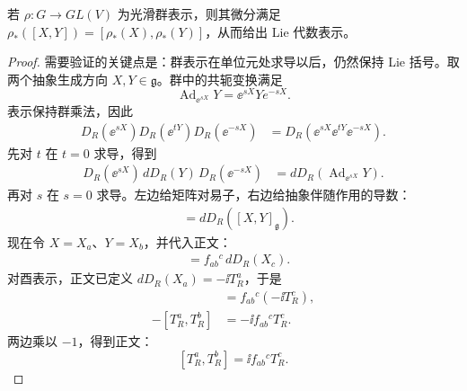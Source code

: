 \begin{proposition}[表示的微分保持括号]
若 $\rho:G\to GL(V)$ 为光滑群表示，则其微分满足 $\rho_*([X,Y])=[\rho_*(X),\rho_*(Y)]$，从而给出 Lie 代数表示。
\end{proposition}
\begin{proof}
需要验证的关键点是：群表示在单位元处求导以后，仍然保持 Lie 括号。取两个抽象生成方向 $X,Y\in\mathfrak g$。群中的共轭变换满足
\[
\operatorname{Ad}_{\ee^{sX}}Y=\ee^{sX}Ye^{-sX}.
\]
表示保持群乘法，因此
\begin{align*}
D_R(\ee^{sX})D_R(\ee^{tY})D_R(\ee^{-sX})
&=D_R\!\left(\ee^{sX}\ee^{tY}\ee^{-sX}\right).
\end{align*}
先对 $t$ 在 $t=0$ 求导，得到
\begin{align*}
D_R(\ee^{sX})\,dD_R(Y)\,D_R(\ee^{-sX})
&=dD_R\!\left(\operatorname{Ad}_{\ee^{sX}}Y\right).
\end{align*}
再对 $s$ 在 $s=0$ 求导。左边给矩阵对易子，右边给抽象伴随作用的导数：
\begin{align*}
[dD_R(X),dD_R(Y)]
&=dD_R([X,Y]_{\mathfrak g}).
\end{align*}
现在令 $X=X_a$、$Y=X_b$，并代入正文：
\begin{align*}
[dD_R(X_a),dD_R(X_b)]
&=f_{ab}{}^c\,dD_R(X_c).
\end{align*}
对酉表示，正文已定义 $dD_R(X_a)=-\ii T_R^a$，于是
\begin{align*}
[-\ii T_R^a,-\ii T_R^b]
&=f_{ab}{}^c(-\ii T_R^c),\\
-[T_R^a,T_R^b]
&=-\ii f_{ab}{}^cT_R^c.
\end{align*}
两边乘以 $-1$，得到正文：
\[
[T_R^a,T_R^b]=\ii f_{ab}{}^cT_R^c.
\]
\end{proof}

